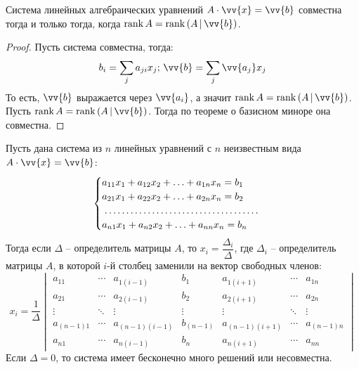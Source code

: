 \documentclass[12pt]{article}
\begin{document}
\begin{theorem}
    Система линейных алгебраических уравнений $A\cdot \vv{x}=\vv{b}$ совместна тогда и только тогда, когда $\rank A=\rank\left(A\,|\,\vv{b}\right)$.
\end{theorem}
\begin{proof}
    Пусть система совместна, тогда:
    $$b_i=\sum_{j}a_{ji}x_j;\, \vv{b}=\sum_{j}\vv{a_j}x_j$$
    То есть, $\vv{b}$ выражается через $\vv{a_i}$, а значит $\rank A=\rank\left(A\,|\,\vv{b}\right)$.
    Пусть $\rank A=\rank\left(A\,|\,\vv{b}\right)$. Тогда по теореме о базисном миноре она совместна.
\end{proof}
\begin{theorem}
    Пусть дана система из $n$ линейных уравнений с $n$ неизвестным вида $A\cdot \vv{x}=\vv{b}$:
    $$\begin{cases}
        a_{11}x_1 + a_{12}x_2 + \ldots + a_{1n}x_n = b_1\\
        a_{21}x_1 + a_{22}x_2 + \ldots + a_{2n}x_n = b_2\\
        \makebox[57mm]{\dotfill}\\
        a_{n1}x_1 + a_{n2}x_2 + \ldots + a_{nn}x_n = b_n
    \end{cases}$$
    Тогда если $\Delta$ – определитель матрицы $A$, то $x_i=\dfrac{\Delta_i}{\Delta}$, где $\Delta_i$ – определитель матрицы $A$, в которой $i$-й столбец заменили на вектор свободных членов:
    $$x_i=\frac{1}{\Delta}\begin{vmatrix}
        a_{11} & \cdots & a_{1(i-1)} & b_1 & a_{1(i+1)} & \cdots & a_{1n}\\
        a_{21} & \cdots & a_{2(i-1)} & b_2 & a_{2(i+1)} & \cdots & a_{2n}\\
        \vdots & \ddots & \vdots & \vdots & \vdots & \ddots & \vdots\\
        a_{(n-1)1} & \cdots & a_{(n-1)(i-1)} & b_{(n-1)} & a_{(n-1)(i+1)} & \cdots & a_{(n-1)n}\\
        a_{n1} & \cdots & a_{n(i-1)} & b_n & a_{n(i+1)} & \cdots & a_{nn}
    \end{vmatrix}$$
    Если $\Delta=0$, то система имеет бесконечно много решений или несовместна.
\end{theorem}
\end{document}
